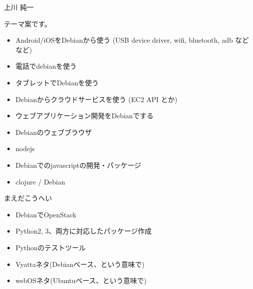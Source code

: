 
\begin{prework}{上川 純一}

テーマ案です。

\begin{itemize}
 \item Android/iOSをDebianから使う (USB device driver, wifi, bluetooth,
       adb などなど)
 \item 電話でdebianを使う
 \item タブレットでDebianを使う
 \item Debianからクラウドサービスを使う (EC2 API とか)
 \item ウェブアプリケーション開発をDebianでする
 \item Debianのウェブブラウザ
 \item nodejs
 \item Debianでのjavascriptの開発・パッケージ
 \item clojure / Debian
\end{itemize}
 
\end{prework}

\begin{prework}{まえだこうへい}

\begin{itemize}
  \item DebianでOpenStack
  \item Python2, 3、両方に対応したパッケージ作成
  \item Pythonのテストツール
  \item Vyattaネタ(Debianベース、という意味で)
  \item webOSネタ(Ubuntuベース、という意味で)
\end{itemize}

\end{prework}

